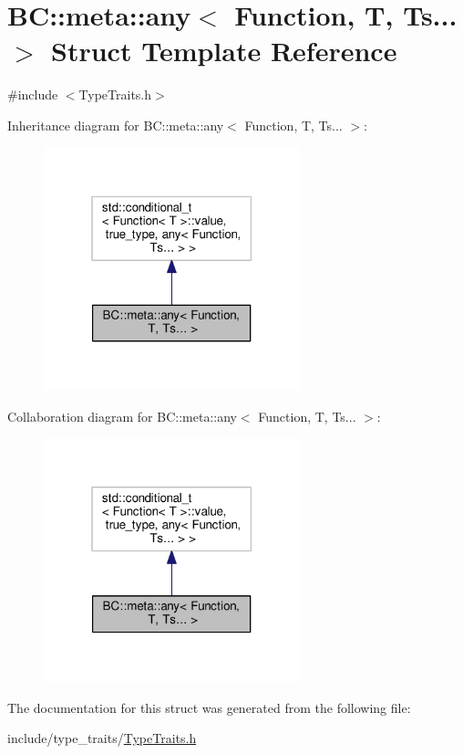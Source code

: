 \hypertarget{structBC_1_1meta_1_1any_3_01Function_00_01T_00_01Ts_8_8_8_01_4}{}\section{BC\+:\+:meta\+:\+:any$<$ Function, T, Ts... $>$ Struct Template Reference}
\label{structBC_1_1meta_1_1any_3_01Function_00_01T_00_01Ts_8_8_8_01_4}


{\ttfamily \#include $<$Type\+Traits.\+h$>$}



Inheritance diagram for BC\+:\+:meta\+:\+:any$<$ Function, T, Ts... $>$\+:
\nopagebreak
\begin{figure}[H]
\begin{center}
\leavevmode
\includegraphics[width=211pt]{structBC_1_1meta_1_1any_3_01Function_00_01T_00_01Ts_8_8_8_01_4__inherit__graph}
\end{center}
\end{figure}


Collaboration diagram for BC\+:\+:meta\+:\+:any$<$ Function, T, Ts... $>$\+:
\nopagebreak
\begin{figure}[H]
\begin{center}
\leavevmode
\includegraphics[width=211pt]{structBC_1_1meta_1_1any_3_01Function_00_01T_00_01Ts_8_8_8_01_4__coll__graph}
\end{center}
\end{figure}


The documentation for this struct was generated from the following file\+:\begin{DoxyCompactItemize}
\item 
include/type\+\_\+traits/\hyperlink{TypeTraits_8h}{Type\+Traits.\+h}\end{DoxyCompactItemize}

